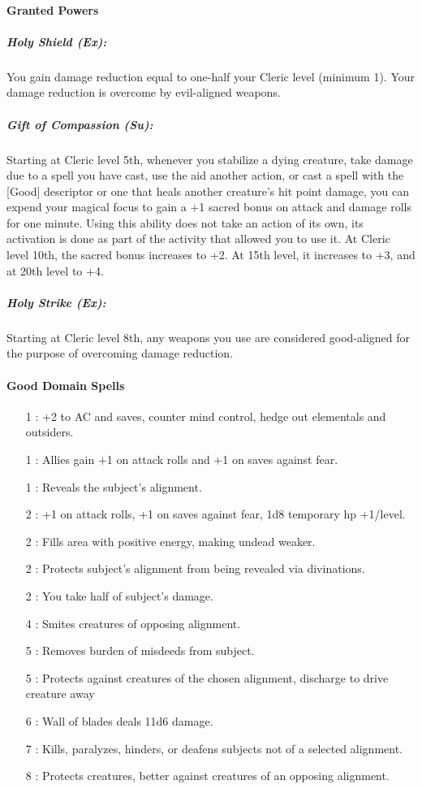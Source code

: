 \paragraph{Granted Powers}
\subparagraph{Holy Shield (Ex):}You gain damage reduction equal to one-half your Cleric level (minimum 1).
Your damage reduction is overcome by evil-aligned weapons.

\subparagraph{Gift of Compassion (Su):}
Starting at Cleric level 5th, whenever you stabilize a dying creature, take damage due to a  spell you have cast, 
use the aid another action, or cast a spell with the [Good] descriptor or one that heals another creature's hit point damage, 
you can expend your magical focus to gain a +1 sacred bonus on attack and damage rolls for one minute.
Using this ability does not take an action of its own, its activation is done as part of the activity that allowed you to use it.
At Cleric level 10th, the sacred bonus increases to +2. At 15th level, it increases to +3, and at 20th level to +4.

\subparagraph{Holy Strike (Ex):}
Starting at Cleric level 8th, any weapons you use are considered good-aligned for the purpose of overcoming damage reduction.
\paragraph{Good Domain Spells}
\begin{itemize}
\item[1] : +2 to AC and saves, counter mind control, hedge out elementals and outsiders.
\item[1] : Allies gain +1 on attack rolls and +1 on saves against fear.
\item[1] : Reveals the subject's alignment.
\item[2] : +1 on attack rolls, +1 on saves against fear, 1d8 temporary hp +1/level.
\item[2] : Fills area with positive energy, making undead weaker.
\item[2] : Protects subject's alignment from being revealed via divinations.
\item[2] : You take half of subject's damage.
\item[4] : Smites creatures of opposing alignment.
\item[5] : Removes burden of misdeeds from subject.
\item[5] : Protects against creatures of the chosen alignment, discharge to drive creature away
\item[6] : Wall of blades deals 11d6 damage.
\item[7] : Kills, paralyzes, hinders, or deafens subjects not of a selected alignment.
\item[8] : Protects creatures, better against creatures of an opposing alignment.
\end{itemize}
